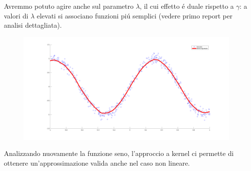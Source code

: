 \documentclass[12pt]{article}
\begin{document}
Avremmo potuto agire anche sul parametro $\lambda$, il cui effetto é duale rispetto a $\gamma$:
a valori di $\lambda$ elevati si associano funzioni piú semplici (vedere primo report per analisi dettagliata).
\begin{figure}[H]
  \centering
  \includegraphics[width=\textwidth]{images/KernelRegressionSine}
\end{figure}
Analizzando nuovamente la funzione seno, l'approccio a kernel ci permette di
ottenere un'approssimazione valida anche nel caso non lineare.

\newpage
\end{document}
